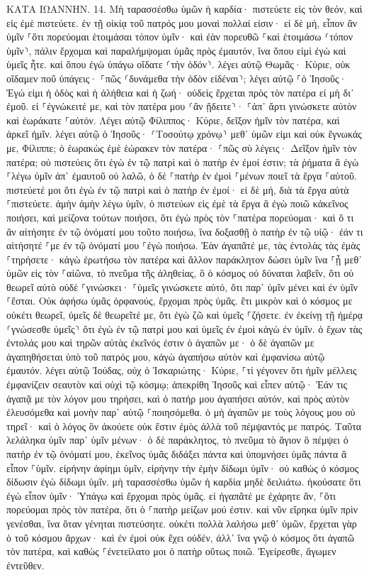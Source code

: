 \documentclass[twoside, 9pt]{extreport}
\begin{document}
ΚΑΤΑ ΙΩΑΝΝΗΝ.
14.
Μὴ ταρασσέσθω ὑμῶν ἡ καρδία· πιστεύετε εἰς τὸν θεόν, καὶ εἰς ἐμὲ πιστεύετε. 
ἐν τῇ οἰκίᾳ τοῦ πατρός μου μοναὶ πολλαί εἰσιν· εἰ δὲ μή, εἶπον ἂν ὑμῖν ⸀ὅτι πορεύομαι ἑτοιμάσαι τόπον ὑμῖν· 
καὶ ἐὰν πορευθῶ ⸀καὶ ἑτοιμάσω ⸂τόπον ὑμῖν⸃, πάλιν ἔρχομαι καὶ παραλήμψομαι ὑμᾶς πρὸς ἐμαυτόν, ἵνα ὅπου εἰμὶ ἐγὼ καὶ ὑμεῖς ἦτε. 
καὶ ὅπου ἐγὼ ὑπάγω οἴδατε ⸂τὴν ὁδόν⸃. 
λέγει αὐτῷ Θωμᾶς· Κύριε, οὐκ οἴδαμεν ποῦ ὑπάγεις· ⸀πῶς ⸂δυνάμεθα τὴν ὁδὸν εἰδέναι⸃; 
λέγει αὐτῷ ⸀ὁ Ἰησοῦς· Ἐγώ εἰμι ἡ ὁδὸς καὶ ἡ ἀλήθεια καὶ ἡ ζωή· οὐδεὶς ἔρχεται πρὸς τὸν πατέρα εἰ μὴ δι᾽ ἐμοῦ. 
εἰ ⸀ἐγνώκειτέ με, καὶ τὸν πατέρα μου ⸂ἂν ᾔδειτε⸃· ⸀ἀπ᾽ ἄρτι γινώσκετε αὐτὸν καὶ ἑωράκατε ⸀αὐτόν. 
Λέγει αὐτῷ Φίλιππος· Κύριε, δεῖξον ἡμῖν τὸν πατέρα, καὶ ἀρκεῖ ἡμῖν. 
λέγει αὐτῷ ὁ Ἰησοῦς· ⸂Τοσούτῳ χρόνῳ⸃ μεθ᾽ ὑμῶν εἰμι καὶ οὐκ ἔγνωκάς με, Φίλιππε; ὁ ἑωρακὼς ἐμὲ ἑώρακεν τὸν πατέρα· ⸀πῶς σὺ λέγεις· Δεῖξον ἡμῖν τὸν πατέρα; 
οὐ πιστεύεις ὅτι ἐγὼ ἐν τῷ πατρὶ καὶ ὁ πατὴρ ἐν ἐμοί ἐστιν; τὰ ῥήματα ἃ ἐγὼ ⸀λέγω ὑμῖν ἀπ᾽ ἐμαυτοῦ οὐ λαλῶ, ὁ δὲ ⸀πατὴρ ἐν ἐμοὶ ⸀μένων ποιεῖ τὰ ἔργα ⸀αὐτοῦ. 
πιστεύετέ μοι ὅτι ἐγὼ ἐν τῷ πατρὶ καὶ ὁ πατὴρ ἐν ἐμοί· εἰ δὲ μή, διὰ τὰ ἔργα αὐτὰ ⸀πιστεύετε. 
ἀμὴν ἀμὴν λέγω ὑμῖν, ὁ πιστεύων εἰς ἐμὲ τὰ ἔργα ἃ ἐγὼ ποιῶ κἀκεῖνος ποιήσει, καὶ μείζονα τούτων ποιήσει, ὅτι ἐγὼ πρὸς τὸν ⸀πατέρα πορεύομαι· 
καὶ ὅ τι ἂν αἰτήσητε ἐν τῷ ὀνόματί μου τοῦτο ποιήσω, ἵνα δοξασθῇ ὁ πατὴρ ἐν τῷ υἱῷ· 
ἐάν τι αἰτήσητέ ⸀με ἐν τῷ ὀνόματί μου ⸀ἐγὼ ποιήσω. 
Ἐὰν ἀγαπᾶτέ με, τὰς ἐντολὰς τὰς ἐμὰς ⸀τηρήσετε· 
κἀγὼ ἐρωτήσω τὸν πατέρα καὶ ἄλλον παράκλητον δώσει ὑμῖν ἵνα ⸀ᾖ μεθ᾽ ὑμῶν εἰς τὸν ⸀αἰῶνα, 
τὸ πνεῦμα τῆς ἀληθείας, ὃ ὁ κόσμος οὐ δύναται λαβεῖν, ὅτι οὐ θεωρεῖ αὐτὸ οὐδὲ ⸀γινώσκει· ⸀ὑμεῖς γινώσκετε αὐτό, ὅτι παρ᾽ ὑμῖν μένει καὶ ἐν ὑμῖν ⸀ἔσται. 
Οὐκ ἀφήσω ὑμᾶς ὀρφανούς, ἔρχομαι πρὸς ὑμᾶς. 
ἔτι μικρὸν καὶ ὁ κόσμος με οὐκέτι θεωρεῖ, ὑμεῖς δὲ θεωρεῖτέ με, ὅτι ἐγὼ ζῶ καὶ ὑμεῖς ⸀ζήσετε. 
ἐν ἐκείνῃ τῇ ἡμέρᾳ ⸂γνώσεσθε ὑμεῖς⸃ ὅτι ἐγὼ ἐν τῷ πατρί μου καὶ ὑμεῖς ἐν ἐμοὶ κἀγὼ ἐν ὑμῖν. 
ὁ ἔχων τὰς ἐντολάς μου καὶ τηρῶν αὐτὰς ἐκεῖνός ἐστιν ὁ ἀγαπῶν με· ὁ δὲ ἀγαπῶν με ἀγαπηθήσεται ὑπὸ τοῦ πατρός μου, κἀγὼ ἀγαπήσω αὐτὸν καὶ ἐμφανίσω αὐτῷ ἐμαυτόν. 
λέγει αὐτῷ Ἰούδας, οὐχ ὁ Ἰσκαριώτης· Κύριε, ⸀τί γέγονεν ὅτι ἡμῖν μέλλεις ἐμφανίζειν σεαυτὸν καὶ οὐχὶ τῷ κόσμῳ; 
ἀπεκρίθη Ἰησοῦς καὶ εἶπεν αὐτῷ· Ἐάν τις ἀγαπᾷ με τὸν λόγον μου τηρήσει, καὶ ὁ πατήρ μου ἀγαπήσει αὐτόν, καὶ πρὸς αὐτὸν ἐλευσόμεθα καὶ μονὴν παρ᾽ αὐτῷ ⸀ποιησόμεθα. 
ὁ μὴ ἀγαπῶν με τοὺς λόγους μου οὐ τηρεῖ· καὶ ὁ λόγος ὃν ἀκούετε οὐκ ἔστιν ἐμὸς ἀλλὰ τοῦ πέμψαντός με πατρός. 
Ταῦτα λελάληκα ὑμῖν παρ᾽ ὑμῖν μένων· 
ὁ δὲ παράκλητος, τὸ πνεῦμα τὸ ἅγιον ὃ πέμψει ὁ πατὴρ ἐν τῷ ὀνόματί μου, ἐκεῖνος ὑμᾶς διδάξει πάντα καὶ ὑπομνήσει ὑμᾶς πάντα ἃ εἶπον ⸀ὑμῖν. 
εἰρήνην ἀφίημι ὑμῖν, εἰρήνην τὴν ἐμὴν δίδωμι ὑμῖν· οὐ καθὼς ὁ κόσμος δίδωσιν ἐγὼ δίδωμι ὑμῖν. μὴ ταρασσέσθω ὑμῶν ἡ καρδία μηδὲ δειλιάτω. 
ἠκούσατε ὅτι ἐγὼ εἶπον ὑμῖν· Ὑπάγω καὶ ἔρχομαι πρὸς ὑμᾶς. εἰ ἠγαπᾶτέ με ἐχάρητε ἄν, ⸀ὅτι πορεύομαι πρὸς τὸν πατέρα, ὅτι ὁ ⸀πατὴρ μείζων μού ἐστιν. 
καὶ νῦν εἴρηκα ὑμῖν πρὶν γενέσθαι, ἵνα ὅταν γένηται πιστεύσητε. 
οὐκέτι πολλὰ λαλήσω μεθ᾽ ὑμῶν, ἔρχεται γὰρ ὁ τοῦ κόσμου ἄρχων· καὶ ἐν ἐμοὶ οὐκ ἔχει οὐδέν, 
ἀλλ᾽ ἵνα γνῷ ὁ κόσμος ὅτι ἀγαπῶ τὸν πατέρα, καὶ καθὼς ⸀ἐνετείλατο μοι ὁ πατὴρ οὕτως ποιῶ. Ἐγείρεσθε, ἄγωμεν ἐντεῦθεν. 
\end{document}
